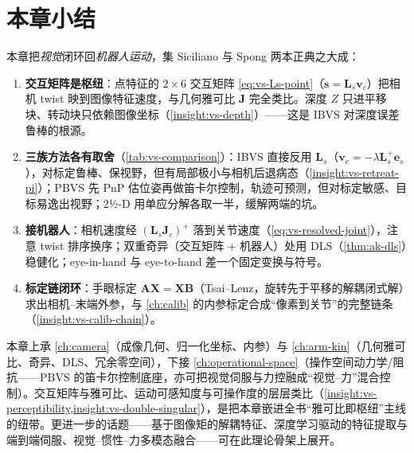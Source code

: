 \section{本章小结}
\label{sec:vs-summary}

本章把\emph{视觉}闭环回\emph{机器人运动}，集 Siciliano\cite{siciliano2009robotics} 与 Spong\cite{spong2006robot} 两本正典之大成：

\begin{enumerate}
  \item \textbf{交互矩阵是枢纽}：点特征的 $2\times6$ 交互矩阵 \cref{eq:vs-Ls-point}（$\dot{\mathbf{s}}=\mathbf{L}_s\mathbf{v}_c$）把相机 twist 映到图像特征速度，与几何雅可比 $\mathbf{J}$ 完全类比。深度 $Z$ 只进平移块、转动块只依赖图像坐标（\cref{insight:vs-depth}）——这是 IBVS 对深度误差鲁棒的根源。
  \item \textbf{三族方法各有取舍}（\cref{tab:vs-comparison}）：IBVS 直接反用 $\mathbf{L}_s$（$\mathbf{v}_c=-\lambda\mathbf{L}_s^{+}\mathbf{e}_s$），对标定鲁棒、保视野，但有局部极小与相机后退病态（\cref{insight:vs-retreat-pi}）；PBVS 先 PnP 估位姿再做笛卡尔控制，轨迹可预测，但对标定敏感、目标易逸出视野；2½-D 用单应分解各取一半，缓解两端的坑。
  \item \textbf{接机器人}：相机速度经 $(\mathbf{L}_s\mathbf{J}_c)^{+}$ 落到关节速度（\cref{eq:vs-resolved-joint}），注意 twist 排序换序；双重奇异（交互矩阵 + 机器人）处用 DLS（\cref{thm:ak-dls}）稳健化；eye-in-hand 与 eye-to-hand 差一个固定变换与符号。
  \item \textbf{标定链闭环}：手眼标定 $\mathbf{A}\mathbf{X}=\mathbf{X}\mathbf{B}$（Tsai--Lenz，旋转先于平移的解耦闭式解）求出相机--末端外参，与 \cref{ch:calib} 的内参标定合成“像素到关节”的完整链条（\cref{insight:vs-calib-chain}）。
\end{enumerate}

\begin{note}[与全书的接口]\label{note:vs-interfaces}
本章上承 \cref{ch:camera}（成像几何、归一化坐标、内参）与 \cref{ch:arm-kin}（几何雅可比、奇异、DLS、冗余零空间），下接 \cref{ch:operational-space}（操作空间动力学/阻抗——PBVS 的笛卡尔控制底座，亦可把视觉伺服与力控融成“视觉--力”混合控制）。交互矩阵与雅可比、运动可感知度与可操作度的层层类比（\cref{insight:vs-perceptibility,insight:vs-double-singular}），是把本章嵌进全书“雅可比即枢纽”主线的纽带。更进一步的话题——基于图像矩的解耦特征、深度学习驱动的特征提取与端到端伺服、视觉--惯性--力多模态融合——可在此理论骨架上展开。
\end{note}

